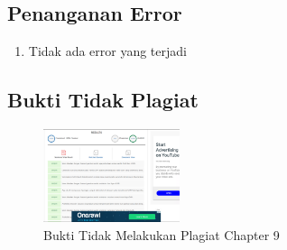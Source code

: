 \subsection{Penanganan Error}
\begin{enumerate}
	\item Tidak ada error yang terjadi
\end{enumerate}

\subsection{Bukti Tidak Plagiat}
\begin{figure}[H]
	\centering
		\includegraphics[width=4cm]{figures/1174095/chapter9/plagiaris.PNG}
		\caption{Bukti Tidak Melakukan Plagiat Chapter 9}
	\end{figure}

